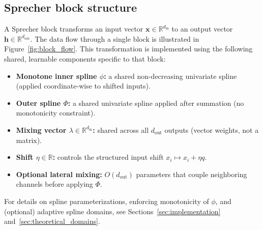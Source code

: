 \documentclass{article}
\theoremstyle{plain}
\theoremstyle{definition}
\theoremstyle{remark}
\begin{document}
\subsection{Sprecher block structure}
A Sprecher block transforms an input vector $\mathbf{x} \in \mathbb{R}^{d_{\mathrm{in}}}$ to an output vector $\mathbf{h} \in \mathbb{R}^{d_{\mathrm{out}}}$. The data flow through a single block is illustrated in Figure~\ref{fig:block_flow}. This transformation is implemented using the following shared, learnable components specific to that block:
\begin{itemize}
    \item \textbf{Monotone inner spline $\phi$:} a shared non-decreasing univariate spline (applied coordinate-wise to shifted inputs).
    \item \textbf{Outer spline $\Phi$:} a shared univariate spline applied after summation (no monotonicity constraint).
    \item \textbf{Mixing vector $\lambda\in\mathbb{R}^{d_{\mathrm{in}}}$:} shared across all $d_{\mathrm{out}}$ outputs (vector weights, not a matrix).
    \item \textbf{Shift $\eta\in\mathbb{R}$:} controls the structured input shift $x_i\mapsto x_i+\eta q$.
    \item \textbf{Optional lateral mixing:} $O(d_{\mathrm{out}})$ parameters that couple neighboring channels before applying $\Phi$.
\end{itemize}
For details on spline parameterizations, enforcing monotonicity of $\phi$, and (optional) adaptive spline domains, see Sections~\ref{sec:implementation} and~\ref{sec:theoretical_domains}.
\end{document}

